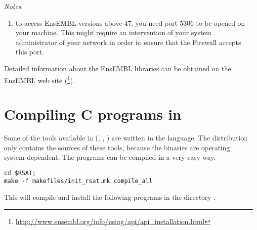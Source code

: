 \documentclass[12pt,a4paper, oneside]{scrreprt} %
\begin{document}

\emph{Notes}: 
\begin{enumerate}
\item to access EnsEMBL versions above 47, you need port 5306 to be
  opened on your machine. This might require an intervention of your
  system administrator of your network in order to ensure that the
  Firewall accepts this port.
\end{enumerate}

Detailed information about the EnsEMBL libraries can be obtained on
the EnsEMBL web site
(\footnote{\url{http://www.ensembl.org/info/using/api/api\_installation.html}}).


\chapter{Compiling C programs in \RSAT}

Some of the tools available in \RSAT (,
, ) are written in the
 language. The distribution only contains the sources of
these tools, because the binaries are operating system-dependent. The
programs can be compiled in a very easy way.

\begin{lstlisting}
cd $RSAT;
make -f makefiles/init_rsat.mk compile_all
\end{lstlisting}

This will compile and install the following programs in the directory
. 










\end{document}
